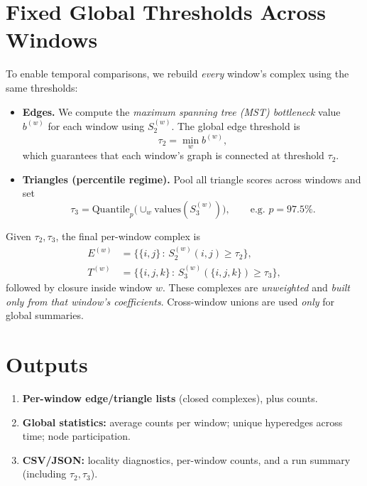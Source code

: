 \documentclass[11pt]{article}
\begin{document}
\section{Fixed Global Thresholds Across Windows}
To enable temporal comparisons, we rebuild \emph{every} window's complex using the same thresholds:

\begin{itemize}[leftmargin=1.2em]
\item \textbf{Edges.} We compute the \emph{maximum spanning tree (MST) bottleneck} value \(b^{(w)}\) for each window using \(S^{(w)}_2\). The global edge threshold is
\[
\tau_2 = \min_w b^{(w)},
\]
which guarantees that each window's graph is connected at threshold \(\tau_2\).
\item \textbf{Triangles (percentile regime).} Pool all triangle scores across windows and set
\[
\tau_3 = \mathrm{Quantile}_{p}\big(\cup_w \mathrm{values}(S^{(w)}_3)\big),\qquad \text{e.g.\ } p=97.5\%.
\]
\end{itemize}

Given \(\tau_2,\tau_3\), the final per-window complex is
\begin{align*}
E^{(w)} &= \big\{\{i,j\}\,:\, S^{(w)}_2(i,j)\ge \tau_2\big\},\\
T^{(w)} &= \big\{\{i,j,k\}\,:\, S^{(w)}_3(\{i,j,k\})\ge \tau_3\big\},
\end{align*}
followed by closure inside window \(w\). These complexes are \emph{unweighted} and \emph{built only from that window's coefficients}. Cross-window unions are used \emph{only} for global summaries.

\section{Outputs}
\begin{enumerate}[leftmargin=1.2em]
\item \textbf{Per-window edge/triangle lists} (closed complexes), plus counts.
\item \textbf{Global statistics:} average counts per window; unique hyperedges across time; node participation.
\item \textbf{CSV/JSON:} locality diagnostics, per-window counts, and a run summary (including \(\tau_2,\tau_3\)).
\end{enumerate}
\end{document}

